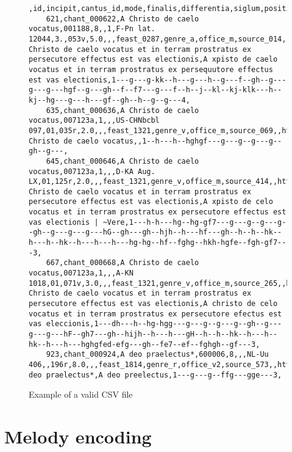\begin{figure}[h]
    \begin{lstlisting}[breaklines]
    ,id,incipit,cantus_id,mode,finalis,differentia,siglum,position,folio,sequence,marginalia,cao_concordances,feast_id,genre_id,office_id,source_id,melody_id,drupal_path,full_text,full_text_manuscript,volpiano,notes
    621,chant_000622,A Christo de caelo vocatus,001188,8,,1,F-Pn lat. 12044,3.,053v,5.0,,,feast_0287,genre_a,office_m,source_014,,http://cantus.uwaterloo.ca/chant/399542/,A Christo de caelo vocatus et in terram prostratus ex persecutore effectus est vas electionis,A xpisto de caelo vocatus et in terram prostratus ex persequutore effectus est vas electionis,1---g---g-kk--h---g---h--g---f--gh--g---g---g---hgf--g---gh--f--f7---g---f--h--j--kl--kj-klk---h--kj--hg---g---h---gf--gh--h--g--g---4,
    635,chant_000636,A Christo de caelo vocatus,007123a,1,,,US-CHNbcbl 097,01,035r,2.0,,,feast_1321,genre_v,office_m,source_069,,http://cantus.uwaterloo.ca/chant/665425/,A Christo de caelo vocatus,,1--h---h--hghgf---g---g--g---g--gh--g---,
    645,chant_000646,A Christo de caelo vocatus,007123a,1,,,D-KA Aug. LX,01,125r,2.0,,,feast_1321,genre_v,office_m,source_414,,http://cantus.uwaterloo.ca/chant/617583/,A Christo de caelo vocatus et in terram prostratus ex persecutore effectus est vas electionis,A xpisto de celo vocatus et in terram prostratus ex persecutore effectus est vas electionis | ~Vere,1---h-h---hg--hg-gf7---g---g--g---g--gh--g---g---g---hG--gh---gh--hjh--h---hf---gh--h--h--hk--h---h--hk--h---h---h---hg-hg--hf--fghg--hkh-hgfe--fgh-gf7---3,
    667,chant_000668,A Christo de caelo vocatus,007123a,1,,,A-KN 1018,01,071v,3.0,,,feast_1321,genre_v,office_m,source_265,,http://cantus.uwaterloo.ca/chant/293103/,A Christo de caelo vocatus et in terram prostratus ex persecutore effectus est vas electionis,A christo de celo vocatus et in terram prostratus ex persecutore efectus est vas eleccionis,1---dh---h--hg-hgg---g---g--g---g--gh--g---g---g---hF--gh7---gh--hijh--h---h---gH--h--h--hk--h---h--hk--h---h---hghgfed-efg---gh--fe7--ef--fghgh--gf---3,
    923,chant_000924,A deo praelectus*,600006,8,,,NL-Uu 406,,196r,8.0,,,feast_1814,genre_r,office_v2,source_573,,http://cantus.uwaterloo.ca/chant/497010/,A deo praelectus*,A deo preelectus,1---g---g--ffg---gge---3,
    \end{lstlisting}
\caption{Example of a valid CSV file}
\end{figure}

\section{Melody encoding}

